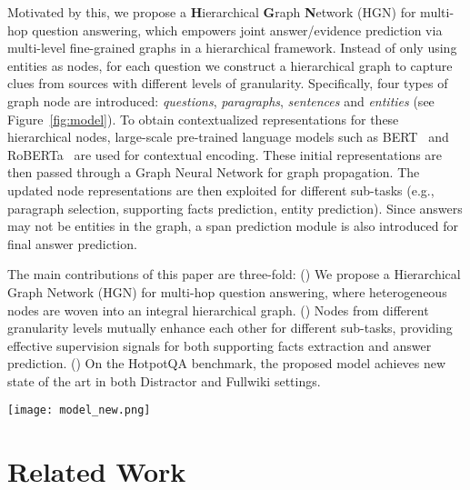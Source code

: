 \documentclass[11pt,a4paper]{article}
\begin{document}
Motivated by this, we propose a \textbf{H}ierarchical \textbf{G}raph \textbf{N}etwork (\textsc{HGN}) for multi-hop question answering, which empowers joint answer/evidence prediction via multi-level fine-grained graphs in a hierarchical framework. Instead of only using entities as nodes, for each question we construct a hierarchical graph to capture clues from sources with different levels of granularity. Specifically, four types of graph node are introduced: \emph{questions}, \emph{paragraphs}, \emph{sentences} and \emph{entities} (see Figure~\ref{fig:model}). To obtain contextualized representations for these hierarchical nodes, large-scale pre-trained language models such as BERT~\cite{devlin2018bert} and RoBERTa~\cite{liu2019roberta} are used for contextual encoding. These initial representations are then passed through a Graph Neural Network for graph propagation. The updated node representations are then exploited for different sub-tasks (e.g., paragraph selection, supporting facts prediction, entity prediction). Since answers may not be entities in the graph, a span prediction module is also introduced for final answer prediction. 


The main contributions of this paper are three-fold: () We propose a Hierarchical Graph Network (HGN) for multi-hop question answering, where heterogeneous nodes are woven into an integral hierarchical graph. () Nodes from different granularity levels mutually enhance each other for different sub-tasks, providing effective supervision signals for both supporting facts extraction and answer prediction. () On the HotpotQA benchmark, the proposed model achieves new state of the art in both Distractor and Fullwiki settings.

\begin{figure*}[t!]
\centering
{\texttt{[image: model\_new.png]}}
\caption{\label{fig:model} Model architecture of Hierarchical Graph Network. The constructed graph corresponds to the example in Figure~\ref{fig:example_question}. {\color{applegreen}Green}, {\color{blue}blue}, {\color{amber}orange}, and {\color{brown}brown} colors represent paragraph (P), sentence (S), entity (E), and question (Q) nodes, respectively. Some entities and hyperlinks are omitted for simplicity.}
\end{figure*}



\section{Related Work}
\end{document}
